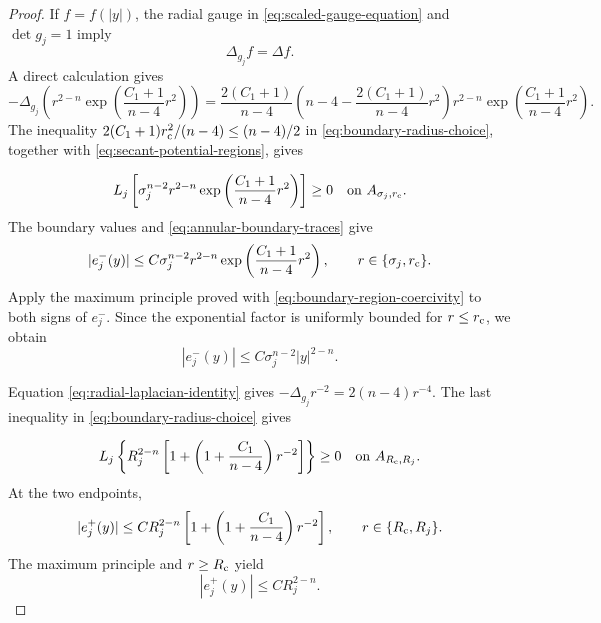 \documentclass[11pt]{article}
\numberwithin{equation}{section}
\theoremstyle{remark}
\begin{document}
\begin{proof}
If \(f=f(|y|)\), the radial gauge in \eqref{eq:scaled-gauge-equation} and
\(\det g_j=1\) imply
\begin{equation}\label{eq:radial-laplacian-identity}
 \Delta_{g_j}f=\Delta f.
\end{equation}
A direct calculation gives
\[
 -\Delta_{g_j}\left(
 r^{2-n}\exp\left(\frac{C_1+1}{n-4}r^2\right)\right)
 =\frac{2(C_1+1)}{n-4}
 \left(n-4-\frac{2(C_1+1)}{n-4}r^2\right)
 r^{2-n}\exp\left(\frac{C_1+1}{n-4}r^2\right).
\]
The inequality
\(2(C_1+1)r_{\rm c}^2/(n-4)\le(n-4)/2\) in
\eqref{eq:boundary-radius-choice}, together with
\eqref{eq:secant-potential-regions}, gives
 
\[
  L_j\left[
 \sigma_j^{n-2}r^{2-n}
 \exp\left(\frac{C_1+1}{n-4}r^2\right)\right]\ge0
 \quad\text{on }A_{\sigma_j,r_{\rm c}}.
\]
The boundary values and \eqref{eq:annular-boundary-traces} give
\[
 |e_j^-(y)|\le
 C\sigma_j^{n-2}r^{2-n}
 \exp\left(\frac{C_1+1}{n-4}r^2\right),
 \qquad r\in\{\sigma_j,r_{\rm c}\}.
\]
Apply the maximum principle proved with
\eqref{eq:boundary-region-coercivity} to both signs of \(e_j^-\).
Since the exponential factor is uniformly
bounded for \(r\le r_{\rm c}\), we obtain
\begin{equation}\label{eq:inner-extension-C0}
 |e_j^-(y)|\le C\sigma_j^{n-2}|y|^{2-n}.
\end{equation}

Equation \eqref{eq:radial-laplacian-identity} gives
\(-\Delta_{g_j}r^{-2}=2(n-4)r^{-4}\).  The last inequality in
\eqref{eq:boundary-radius-choice} gives
 
\[
  L_j\left\{R_j^{2-n}
 \left[1+\left(1+\frac{C_1}{n-4}\right)r^{-2}\right]\right\}
 \ge0\quad\text{on }A_{R_{\rm c},R_j}.
\]
At the two endpoints,
\[
 |e_j^+(y)|\le CR_j^{2-n}
 \left[1+\left(1+\frac{C_1}{n-4}\right)r^{-2}\right],
 \qquad r\in\{R_{\rm c},R_j\}.
\]
The maximum principle and \(r\ge R_{\rm c}\) yield
\begin{equation}\label{eq:outer-extension-C0}
 |e_j^+(y)|\le CR_j^{2-n}.
\end{equation}


\end{proof}
\end{document}

